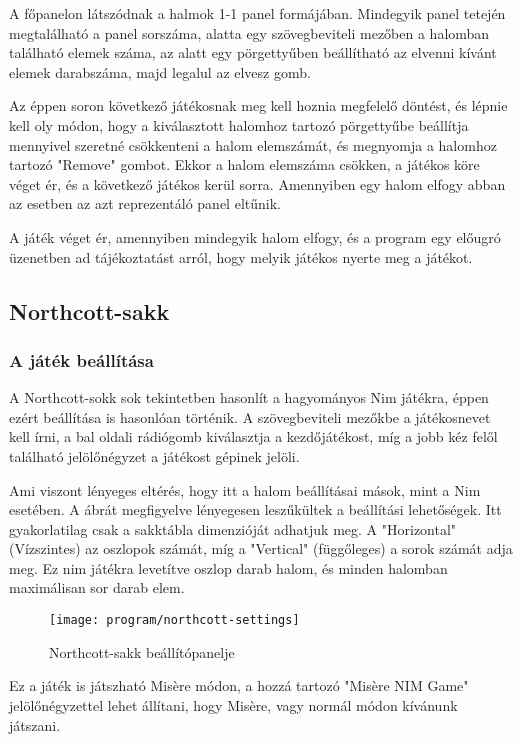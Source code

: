 A főpanelon látszódnak a halmok 1-1 panel formájában. Mindegyik panel tetején megtalálható a panel sorszáma, alatta egy szövegbeviteli mezőben a halomban található elemek száma, az alatt egy pörgettyűben beállítható az elvenni kívánt elemek darabszáma, majd legalul az elvesz gomb. \ujsor

Az éppen soron következő játékosnak meg kell hoznia megfelelő döntést, és lépnie kell oly módon, hogy a kiválasztott halomhoz tartozó pörgettyűbe beállítja mennyivel szeretné csökkenteni a halom elemszámát, és megnyomja a halomhoz tartozó "Remove" gombot. Ekkor a halom elemszáma csökken, a játékos köre véget ér, és a következő játékos kerül sorra. Amennyiben egy halom elfogy abban az esetben az azt reprezentáló panel eltűnik.\ujsor

A játék véget ér, amennyiben mindegyik halom elfogy, és a program egy előugró üzenetben ad tájékoztatást arról, hogy melyik játékos nyerte meg a játékot.

\subsection{Northcott-sakk}
\subsubsection*{A játék beállítása}
A Northcott-sokk sok tekintetben hasonlít a hagyományos Nim játékra, éppen ezért beállítása is hasonlóan történik. A szövegbeviteli mezőkbe a játékosnevet kell írni, a bal oldali rádiógomb kiválasztja a kezdőjátékost, míg a jobb kéz felől található jelölőnégyzet a játékost gépinek jelöli.\ujsor

Ami viszont lényeges eltérés, hogy itt a halom beállításai mások, mint a Nim esetében. A  ábrát megfigyelve lényegesen leszűkültek a beállítási lehetőségek. Itt gyakorlatilag csak a sakktábla dimenzióját adhatjuk meg. A "Horizontal" (Vízszintes) az oszlopok számát, míg a "Vertical" (függőleges) a sorok számát adja meg. Ez nim játékra levetítve oszlop darab halom, és minden halomban maximálisan sor darab elem.

\begin{figure}[ht]
	\texttt{[image: program/northcott-settings]}
	\centering
	\caption{Northcott-sakk beállítópanelje}
	\label{fig:northcott-settings}
\end{figure}

Ez a játék is játszható Misère módon, a hozzá tartozó "Misère NIM Game" jelölőnégyzettel lehet állítani, hogy Misère, vagy normál módon kívánunk játszani.

